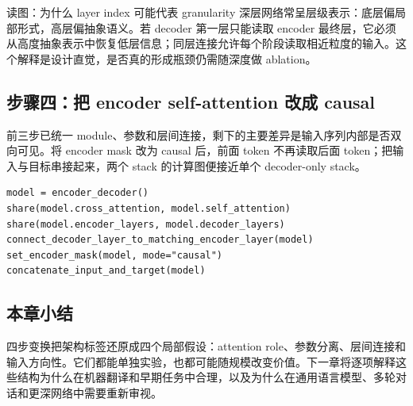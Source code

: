 

\begin{knowledgebox}{读图：为什么 layer index 可能代表 granularity}
深层网络常呈层级表示：底层偏局部形式，高层偏抽象语义。若 decoder 第一层只能读取 encoder 最终层，它必须从高度抽象表示中恢复低层信息；同层连接允许每个阶段读取相近粒度的输入。这个解释是设计直觉，是否真的形成瓶颈仍需随深度做 ablation。
\end{knowledgebox}

\subsection{步骤四：把 encoder self-attention 改成 causal}

前三步已统一 module、参数和层间连接，剩下的主要差异是输入序列内部是否双向可见。将 encoder mask 改为 causal 后，前面 token 不再读取后面 token；把输入与目标串接起来，两个 stack 的计算图便接近单个 decoder-only stack。



\begin{lstlisting}[caption={四步 architecture transformation 的概念伪代码}]
model = encoder_decoder()
share(model.cross_attention, model.self_attention)
share(model.encoder_layers, model.decoder_layers)
connect_decoder_layer_to_matching_encoder_layer(model)
set_encoder_mask(model, mode="causal")
concatenate_input_and_target(model)
\end{lstlisting}


\subsection{本章小结}

四步变换把架构标签还原成四个局部假设：attention role、参数分离、层间连接和输入方向性。它们都能单独实验，也都可能随规模改变价值。下一章将逐项解释这些结构为什么在机器翻译和早期任务中合理，以及为什么在通用语言模型、多轮对话和更深网络中需要重新审视。

